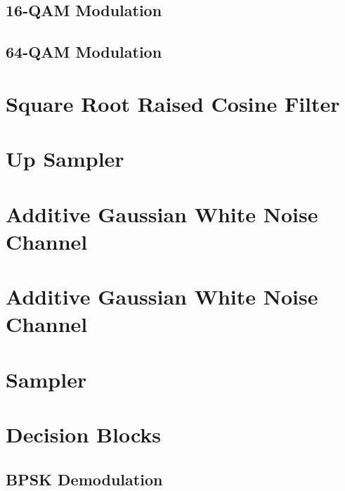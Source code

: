 \documentclass[]{article}
\begin{document}
\subsection{16-QAM Modulation}
\label{app:qam_16_mod}


\cleardoublepage  %
\newpage

\subsection{64-QAM Modulation }
\label{app:qam_64_mod}

\cleardoublepage  %
\newpage

\section{Square Root Raised Cosine Filter}
\label{app:sqrt_raised_cosine}

\cleardoublepage
\newpage

\section{Up Sampler}
\label{app:impulse_train}

\cleardoublepage
\newpage

\section{Additive Gaussian White Noise Channel}
\label{app:awgn_channel}

\cleardoublepage
\newpage

\section{Additive Gaussian White Noise Channel}
\label{app:awgn_channel}

\cleardoublepage
\newpage

\section{Sampler}
\label{app:sampler}

\cleardoublepage
\newpage

\section{Decision Blocks}
\label{app:dblocks}
\subsection{BPSK Demodulation}
\label{app:bpsk_demod}

\cleardoublepage
\newpage
\end{document}

